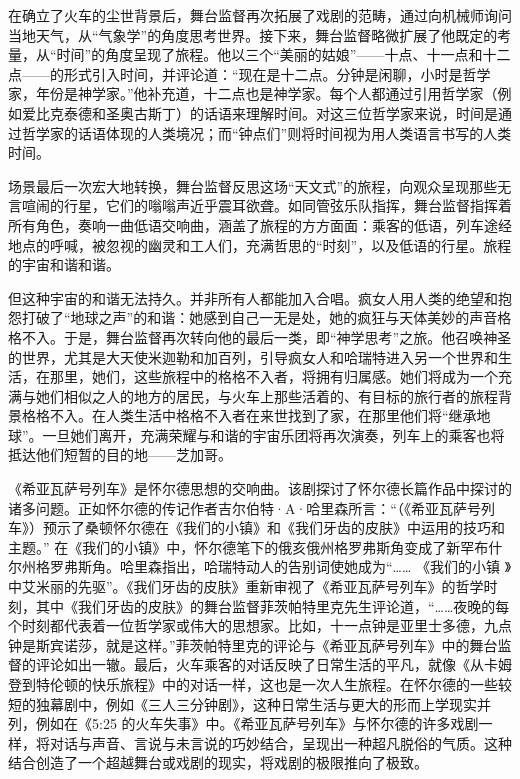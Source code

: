 \documentclass[lang=cn,newtx,10pt,scheme=chinese]{elegantbook}
\begin{document}
在确立了火车的尘世背景后，舞台监督再次拓展了戏剧的范畴，通过向机械师询问当地天气，从“气象学”的角度思考世界。接下来，舞台监督略微扩展了他既定的考量，从“时间”的角度呈现了旅程。他以三个“美丽的姑娘”——十点、十一点和十二点——的形式引入时间，并评论道：“现在是十二点。分钟是闲聊，小时是哲学家，年份是神学家。”他补充道，十二点也是神学家。每个人都通过引用哲学家（例如爱比克泰德和圣奥古斯丁）的话语来理解时间。对这三位哲学家来说，时间是通过哲学家的话语体现的人类境况；而“钟点们”则将时间视为用人类语言书写的人类时间。

场景最后一次宏大地转换，舞台监督反思这场“天文式”的旅程，向观众呈现那些无言喧闹的行星，它们的嗡嗡声近乎震耳欲聋。如同管弦乐队指挥，舞台监督指挥着所有角色，奏响一曲低语交响曲，涵盖了旅程的方方面面：乘客的低语，列车途经地点的呼喊，被忽视的幽灵和工人们，充满哲思的“时刻”，以及低语的行星。旅程的宇宙和谐和谐。

但这种宇宙的和谐无法持久。并非所有人都能加入合唱。疯女人用人类的绝望和抱怨打破了“地球之声”的和谐：她感到自己一无是处，她的疯狂与天体美妙的声音格格不入。于是，舞台监督再次转向他的最后一类，即“神学思考”之旅。他召唤神圣的世界，尤其是大天使米迦勒和加百列，引导疯女人和哈瑞特进入另一个世界和生活，在那里，她们，这些旅程中的格格不入者，将拥有归属感。她们将成为一个充满与她们相似之人的地方的居民，与火车上那些活着的、有目标的旅行者的旅程背景格格不入。在人类生活中格格不入者在来世找到了家，在那里他们将“继承地球”。一旦她们离开，充满荣耀与和谐的宇宙乐团将再次演奏，列车上的乘客也将抵达他们短暂的目的地——芝加哥。

《希亚瓦萨号列车》是怀尔德思想的交响曲。该剧探讨了怀尔德长篇作品中探讨的诸多问题。正如怀尔德的传记作者吉尔伯特·A·哈里森所言：“（《希亚瓦萨号列车》）预示了桑顿怀尔德在《我们的小镇》和《我们牙齿的皮肤》中运用的技巧和主题。” 在《我们的小镇》中，怀尔德笔下的俄亥俄州格罗弗斯角变成了新罕布什尔州格罗弗斯角。哈里森指出，哈瑞特动人的告别词使她成为“…… 《我们的小镇 》中艾米丽的先驱”。《我们牙齿的皮肤》重新审视了《希亚瓦萨号列车》的哲学时刻，其中《我们牙齿的皮肤》的舞台监督菲茨帕特里克先生评论道，“……夜晚的每个时刻都代表着一位哲学家或伟大的思想家。比如，十一点钟是亚里士多德，九点钟是斯宾诺莎，就是这样。”菲茨帕特里克的评论与《希亚瓦萨号列车》中的舞台监督的评论如出一辙。最后，火车乘客的对话反映了日常生活的平凡，就像《从卡姆登到特伦顿的快乐旅程》中的对话一样，这也是一次人生旅程。在怀尔德的一些较短的独幕剧中，例如《三人三分钟剧》，这种日常生活与更大的形而上学现实并列，例如在《5:25 的火车失事》中。《希亚瓦萨号列车》与怀尔德的许多戏剧一样，将对话与声音、言说与未言说的巧妙结合，呈现出一种超凡脱俗的气质。这种结合创造了一个超越舞台或戏剧的现实，将戏剧的极限推向了极致。
\end{document}
